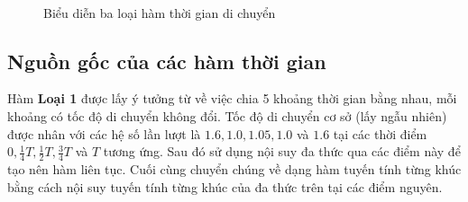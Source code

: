 \documentclass[../main.tex]{subfiles}
\begin{document}
\begin{figure}
  \centering

  \\


  \caption{Biểu diễn ba loại hàm thời gian di chuyển}
  \label{fig:11}
\end{figure}

\subsection{Nguồn gốc của các hàm thời
gian}\label{nguux1ed3n-gux1ed1c-cux1ee7a-cuxe1c-huxe0m-thux1eddi-gian}

Hàm \textbf{Loại 1} được lấy ý tưởng từ \cite{figliozzi2012time} về
việc chia 5 khoảng thời gian bằng nhau, mỗi khoảng có tốc độ di chuyển
không đổi. Tốc độ di chuyển cơ sở (lấy ngẫu nhiên) được nhân với các hệ
số lần lượt là \(1.6, 1.0, 1.05, 1.0\) và \(1.6\) tại các thời điểm
\(0, \frac 1 4 T, \frac 1 2 T, \frac 3 4 T\) và \(T\) tương ứng. Sau đó sử dụng nội suy đa
thức qua các điểm này để tạo nên hàm liên tục. Cuối cùng chuyển chúng về
dạng hàm tuyến tính từng khúc bằng cách nội suy tuyến tính từng khúc của
đa thức trên tại các điểm nguyên.
\end{document}
